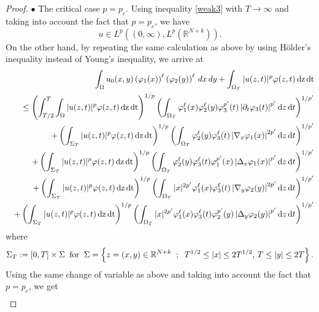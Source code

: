 \documentclass[reqno,11pt]{amsart}
\numberwithin{equation}{section}
\begin{document}
\begin{proof}
	\noindent $\bullet$ The critical case $p=p_c$. Using inequality
	\eqref{weak3}  with $T\rightarrow\infty $ and taking into account the fact that $p=p_c$, we have
	\begin{equation}\label{regularity}
		u\in L^p((0,\infty),L^p(\mathbb{R}^{N+k})).
	\end{equation}
	On the other hand, by repeating the same calculation as above by using H\"older's inequality instead of Young's inequality, we arrive at
	\begin{eqnarray*}
		&{}&\int_{\Omega}u_0(x,y)\left(\varphi_1(x)\right)^\ell \left(\varphi_2(y)\right)^\ell\,dx\,dy+\int_{\Omega_T}|u(z,t)|^{p}\varphi(z,t)\,\mathrm{dz}\,\mathrm{dt}\\
		&{}&\leq \left(\int_{T/2}^T\int_{\Omega}|u(z,t)|^{p}\varphi(z,t)\,\mathrm{dz}\,\mathrm{dt}\right)^{1/p}\left(\int_{\Omega_T}\varphi_1^\ell(x)\varphi_2^\ell(y)\varphi_3^{p^\prime}(t)\left|\partial_t \varphi_3(t)\right|^{p'}\mathrm{d}z\,\mathrm{d}t\right)^{1/p'}\\
		&{}&+\left(\int_{\Sigma_T}|u(z,t)|^{p}\varphi(z,t)\,\mathrm{dz}\,\mathrm{dt}\right)^{1/p}\left(\int_{\Omega_T}\varphi_2^\ell(y)\varphi_3^\ell(t)\left|\nabla_x \varphi_1(x)\right|^{2p'}\mathrm{d}z\,\mathrm{d}t\right)^{1/p'}\notag\\
		&{}&+\left(\int_{\Sigma_T}|u(z,t)|^{p}\varphi(z,t)\,\mathrm{dz}\,\mathrm{dt}\right)^{1/p}\left(\int_{\Omega_T}\varphi_2^\ell(y)\varphi_3^\ell(t)\varphi_1^{p'}(x)\left|\Delta_x \varphi_1(x)\right|^{p'}\mathrm{d}z\,\mathrm{d}t\right)^{1/p'}\\
		&{}&+\left(\int_{\Sigma_T}|u(z,t)|^{p}\varphi(z,t)\,\mathrm{dz}\,\mathrm{dt}\right)^{1/p}\left(\int_{\Omega_T}|x|^{2p'}\varphi_1^\ell(x)\varphi_3^\ell(t)\left|\nabla_y \varphi_2(y)\right|^{2p'}\mathrm{d}z\,\mathrm{d}t\right)^{1/p'}\notag\\
		&{}&+\left(\int_{\Sigma_T}|u(z,t)|^{p}\varphi(z,t)\,\mathrm{dz}\,\mathrm{dt}\right)^{1/p}\left(\int_{\Omega_T}|x|^{2p'}\varphi_1^\ell(x)\varphi_3^\ell(t)\varphi_2^{p'}(y)\left|\Delta_y \varphi_2(y)\right|^{p'}\mathrm{d}z\,\mathrm{d}t\right)^{1/p'}
	\end{eqnarray*}
	where
	$$\Sigma_T:=[0,T]\times\Sigma\;\;\text{for}\;\; \Sigma=\left\{ z=(x,y)\in{\mathbb{R}}^{N+k}\hspace{2
		mm};\hspace{2mm}T^{1/2}\leq |x|\leq 2 T^{1/2},\,T\leq |y|\leq 2 T\right\}.$$
	Using the same change of variable as above and taking into account the fact that $p=p_c$, we get
	\begin{align*}

\end{align*}
\end{proof}
\end{document}
